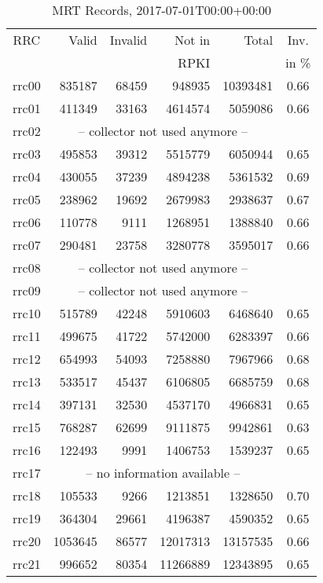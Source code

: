 \begin{table}
  \caption{MRT Records, 2017-07-01T00:00+00:00}
  \label{tab:rrc}
  \begin{tabular}{c|rrr|r|c}
  \toprule
  RRC&Valid&Invalid&Not in&Total&Inv.\\&&&RPKI&&in \%\\
  \midrule
  rrc00&\num{835187}&\num{68459}&\num{948935}&\num{10393481}&0.66\\
  rrc01&\num{411349}&\num{33163}&\num{4614574}&\num{5059086}&0.66\\
  rrc02&\multicolumn{4}{c|}{-- collector not used anymore --}&\\
  rrc03&\num{495853}&\num{39312}&\num{5515779}&\num{6050944}&0.65\\
  rrc04&\num{430055}&\num{37239}&\num{4894238}&\num{5361532}&0.69\\
  rrc05&\num{238962}&\num{19692}&\num{2679983}&\num{2938637}&0.67\\
  rrc06&\num{110778}&\num{9111}&\num{1268951}&\num{1388840}&0.66\\
  rrc07&\num{290481}&\num{23758}&\num{3280778}&\num{3595017}&0.66\\
  rrc08&\multicolumn{4}{c|}{-- collector not used anymore --}&\\
  rrc09&\multicolumn{4}{c|}{-- collector not used anymore --}&\\
  rrc10&\num{515789}&\num{42248}&\num{5910603}&\num{6468640}&0.65\\
  rrc11&\num{499675}&\num{41722}&\num{5742000}&\num{6283397}&0.66\\
  rrc12&\num{654993}&\num{54093}&\num{7258880}&\num{7967966}&0.68\\
  rrc13&\num{533517}&\num{45437}&\num{6106805}&\num{6685759}&0.68\\
  rrc14&\num{397131}&\num{32530}&\num{4537170}&\num{4966831}&0.65\\
  rrc15&\num{768287}&\num{62699}&\num{9111875}&\num{9942861}&0.63\\
  rrc16&\num{122493}&\num{9991}&\num{1406753}&\num{1539237}&0.65\\
  rrc17&\multicolumn{4}{c|}{-- no information available --}&\\
  rrc18&\num{105533}&\num{9266}&\num{1213851}&\num{1328650}&0.70\\
  rrc19&\num{364304}&\num{29661}&\num{4196387}&\num{4590352}&0.65\\
  rrc20&\num{1053645}&\num{86577}&\num{12017313}&\num{13157535}&0.66\\
  rrc21&\num{996652}&\num{80354}&\num{11266889}&\num{12343895}&0.65\\
  \bottomrule
  \end{tabular}
\end{table}

